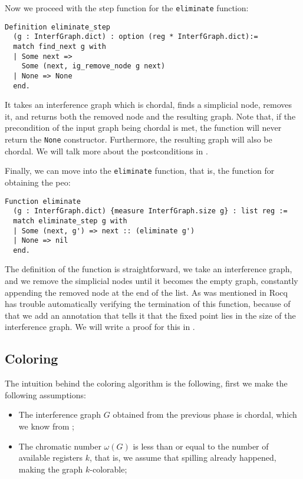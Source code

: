 Now we proceed with the step function for the \texttt{eliminate} function:

\begin{lstlisting}[style=Rocq]
Definition eliminate_step
  (g : InterfGraph.dict) : option (reg * InterfGraph.dict):=
  match find_next g with
  | Some next =>
    Some (next, ig_remove_node g next)
  | None => None
  end.
\end{lstlisting}

It takes an interference graph which is chordal, finds a simplicial node, removes it, and returns both the removed node and the resulting graph.
Note that, if the precondition of the input graph being chordal is met, the function will never return the \texttt{None} constructor. Furthermore, the resulting graph will also be chordal.
We will talk more about the postconditions in .

Finally, we can move into the \texttt{eliminate} function, that is, the function for obtaining the \gls{peo}:

\begin{lstlisting}[style=Rocq]
Function eliminate
  (g : InterfGraph.dict) {measure InterfGraph.size g} : list reg :=
  match eliminate_step g with
  | Some (next, g') => next :: (eliminate g')
  | None => nil
  end.
\end{lstlisting}

The definition of the function is straightforward, we take an interference graph, and we remove the simplicial nodes until it becomes the empty graph, constantly appending the removed node at the end of the list.
As was mentioned in  Rocq has trouble automatically verifying the termination of this function, because of that we add an annotation that tells it that the fixed point lies in the size of the interference graph. We will write a proof for this in .

\subsection{Coloring}
\label{subsec:coloring}

The intuition behind the coloring algorithm is the following, first we make the following assumptions:

\begin{itemize}
  \item The interference graph $G$ obtained from the previous phase is chordal, which we know from ;
  \item The chromatic number $\omega(G)$ is less than or equal to the number of available registers $k$, that is, we assume that spilling already happened, making the graph $k$-colorable;
\end{itemize}

